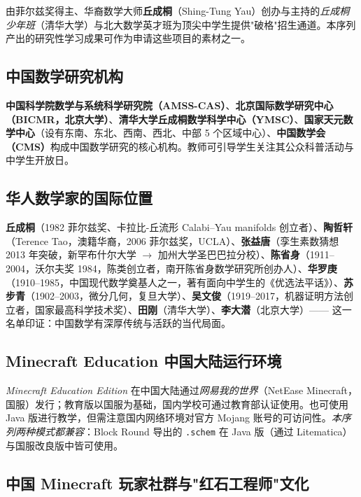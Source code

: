 \documentclass[12pt,a4paper]{scrartcl}
\newcommand{\acc}[1]{\textcolor{accent}{\textbf{#1}}}
\begin{document}
由菲尔兹奖得主、华裔数学大师\acc{丘成桐}（Shing-Tung Yau）创办与主持的\emph{丘成桐少年班}（清华大学）与北大数学英才班为顶尖中学生提供"破格"招生通道。本序列产出的研究性学习成果可作为申请这些项目的素材之一。

\subsection{中国数学研究机构}

\acc{中国科学院数学与系统科学研究院（AMSS-CAS）}、\acc{北京国际数学研究中心（BICMR，北京大学）}、\acc{清华大学丘成桐数学科学中心（YMSC）}、\acc{国家天元数学中心}（设有东南、东北、西南、西北、中部 5 个区域中心）、\acc{中国数学会（CMS）}构成中国数学研究的核心机构。教师可引导学生关注其公众科普活动与中学生开放日。

\subsection{华人数学家的国际位置}

\acc{丘成桐}（1982 菲尔兹奖、卡拉比-丘流形 Calabi--Yau manifolds 创立者）、\acc{陶哲轩}（Terence Tao，澳籍华裔，2006 菲尔兹奖，UCLA）、\acc{张益唐}（孪生素数猜想 2013 年突破，新罕布什尔大学 $\to$ 加州大学圣巴巴拉分校）、\acc{陈省身}（1911--2004，沃尔夫奖 1984，陈类创立者，南开陈省身数学研究所创办人）、\acc{华罗庚}（1910--1985，中国现代数学奠基人之一，著有面向中学生的《优选法平话》）、\acc{苏步青}（1902--2003，微分几何，复旦大学）、\acc{吴文俊}（1919--2017，机器证明方法创立者，国家最高科学技术奖）、\acc{田刚}（清华大学）、\acc{李大潜}（北京大学）—— 这一名单印证：中国数学有深厚传统与活跃的当代局面。

\subsection{Minecraft Education 中国大陆运行环境}\label{sec:mee}

\emph{Minecraft Education Edition} 在中国大陆通过\emph{网易我的世界}（NetEase Minecraft，国服）发行；教育版以国服为基础，国内学校可通过教育部认证使用。也可使用 Java 版进行教学，但需注意国内网络环境对官方 Mojang 账号的可访问性。\emph{本序列两种模式都兼容}：Block Round 导出的 \texttt{.schem} 在 Java 版（通过 Litematica）与国服改良版中皆可使用。

\subsection{中国 Minecraft 玩家社群与"红石工程师"文化}
\end{document}

